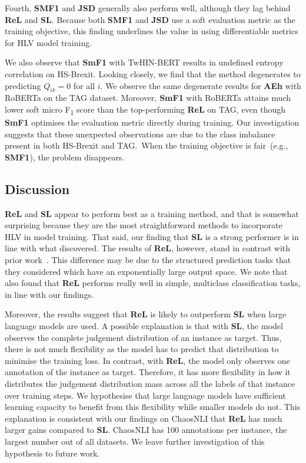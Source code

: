 \documentclass[shortpaper]{clv2025}
\newcommand{\methname}[1]{\textbf{#1}}  %
\begin{document}
Fourth, \methname{SMF1} and \methname{JSD} generally also perform well, although
they lag behind \methname{ReL} and \methname{SL}. Because both
\methname{SMF1} and \methname{JSD} use a soft evaluation metric as the training
objective, this finding underlines the value in using differentiable metrics for
HLV model training.

We also observe that \methname{SmF1} with TwHIN-BERT results in undefined entropy
correlation on HS-Brexit. Looking closely, we find that the method degenerates to
predicting $Q_{ik}=0$ for all $i$. We observe the same degenerate results for
\methname{AEh} with RoBERTa on the TAG dataset. Moreover, \methname{SmF1} with
RoBERTa attains much lower soft micro F\textsubscript{1} score than the
top-performing \methname{ReL} on TAG, even though \methname{SmF1}
optimises the evaluation metric directly during training. Our investigation
suggests that these unexpected observations are due to the class imbalance
present in both HS-Brexit and TAG.\ When the training objective is fair~(e.g.,
\methname{SMF1}), the problem disappears.

\subsection{Discussion}

\methname{ReL} and \methname{SL} appear to perform best as a training method,
and that is somewhat surprising because they are the most straightforward
methods to incorporate HLV in model training.
That said, our finding that \methname{SL} is a strong performer is in line with
what \citet{uma2021} discovered. The results of \methname{ReL}, however, stand
in contrast with prior work~\citep{uma2021,kurniawan2024}.
This difference may be due to the structured prediction tasks that they
considered which have an exponentially large output space. We note that
\citet{uma2021} also found that \methname{ReL} performs really well in simple,
multiclass classification tasks, in line with our findings.

Moreover, the results suggest that \methname{ReL} is likely to outperform
\methname{SL} when large language models are used. A possible explanation is
that with \methname{SL}, the model observes the complete judgement distribution
of an instance as target. Thus, there is not much flexibility as the model has
to predict that distribution to minimise the training loss. In contrast, with
\methname{ReL}, the model only observes one annotation of the instance as
target. Therefore, it has more flexibility in how it distributes the judgement
distribution mass across all the labels of that instance over training steps. We
hypothesise that large language models have sufficient learning capacity to
benefit from this flexibility while smaller models do not. This explanation is
consistent with our findings on ChaosNLI that \methname{ReL} has much larger
gains compared to \methname{SL}. ChaosNLI has 100 annotations per instance, the
largest number out of all datasets. We leave further investigation of this
hypothesis to future work.
\end{document}
